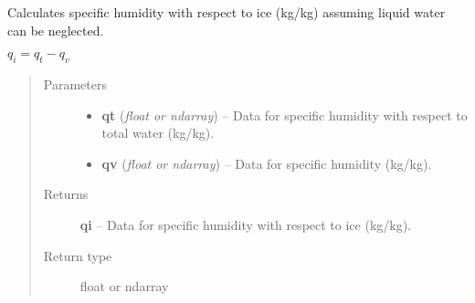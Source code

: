 \documentclass[letterpaper,10pt,english]{sphinxmanual}
\begin{document}
\begin{fulllineitems}
\label{atmos:atmos.equations.qi_from_qt_qv}
Calculates specific humidity with respect to ice (kg/kg) assuming liquid water
can be neglected.

\(q_i = q_t-q_v\)
\begin{quote}\begin{description}
\item[{Parameters}] \leavevmode\begin{itemize}
\item {} 
\textbf{qt} (\emph{float or ndarray}) -- Data for specific humidity with respect to total water (kg/kg).

\item {} 
\textbf{qv} (\emph{float or ndarray}) -- Data for specific humidity (kg/kg).

\end{itemize}

\item[{Returns}] \leavevmode
\textbf{qi} --
Data for specific humidity with respect to ice (kg/kg).

\item[{Return type}] \leavevmode
float or ndarray

\end{description}\end{quote}

\end{fulllineitems}

\end{document}
